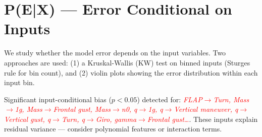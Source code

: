 \documentclass[9pt,a4paper]{article}
\begin{document}
\section{P(E|X) --- Error Conditional on Inputs}
\label{sec:d4}

We study whether the model error depends on the input variables. Two approaches are used: (1) a Kruskal-Wallis (KW) test on binned inputs (Sturges rule for bin count), and (2) violin plots showing the error distribution within each input bin.

Significant input-conditional bias ($p<0.05$) detected for: \textcolor{red}{\textit{FLAP$\to$Turn, Mass$\to$1g, Mass$\to$Frontal gust, Mass$\to$n0, q$\to$1g, q$\to$Vertical maneuver, q$\to$Vertical gust, q$\to$Turn, q$\to$Giro, gamma$\to$Frontal gust\ldots}}. These inputs explain residual variance --- consider polynomial features or interaction terms.
\end{document}
